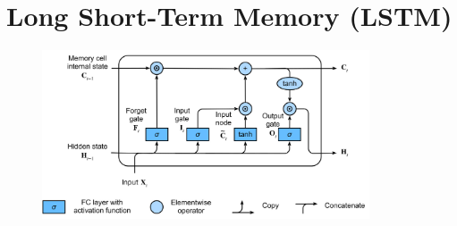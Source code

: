 \chapter{Long Short-Term Memory (LSTM) \cite{dnn-1}}


\begin{figure}[H]
    \centering
    \includegraphics[width=\linewidth, height=5cm, keepaspectratio]{Pictures/lstm/lstm-final.jpg}
\end{figure}

